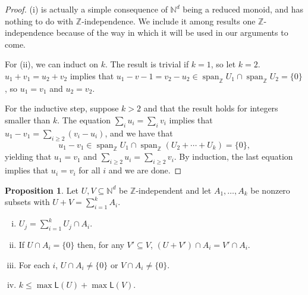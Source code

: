 \documentclass{report}
\newcommand{\NN}{\mathbb{N}}
\newcommand{\ZZ}{\mathbb{Z}}
\renewcommand{\:}{\text{:}}
\theoremstyle{definition}
\newtheorem{prop}[defn]{Proposition}
\begin{document}
\begin{proof}
(i) is actually a simple consequence of $\NN^d$ being a reduced monoid, and has nothing to do with $\ZZ$-independence.  
We include it among results one $\ZZ$-independence because of the way in which it will be used in our arguments to come.

For (ii), we can induct on $k$.
The result is trivial if $k = 1$, so let $k=2$.
$u_1 + v_1 = u_2 + v_2$ implies that $u_1 - v-1 = v_2 - u_2 \in \operatorname{span}_\ZZ U_1 \cap \operatorname{span}_\ZZ U_2 = \{0\}$, so $u_1 = v_1$ and $u_2 = v_2$.

For the inductive step, suppose $k>2$ and that the result holds for integers smaller than $k$.
The equation $\sum_i u_i = \sum_i v_i$ implies that $u_1 - v_1 = \sum_{i\ge 2} (v_i - u_i)$, and we have that 
\[u_1 - v_1 \in \operatorname{span}_\ZZ U_1 \cap \operatorname{span}_\ZZ(U_2+\cdots+ U_k) = \{0\},\]
yielding that $u_1 = v_1$ and $\sum_{i\ge 2} u_i = \sum_{i\ge 2} v_i$.
By induction, the last equation implies that $u_i = v_i$ for all $i$ and we are done.
\end{proof}

\begin{prop} \label{prop:indep-decomp}
Let $U,V \subseteq \NN^d$ be $\ZZ$-independent and let $A_1,\dots, A_k$ be nonzero subsets with $U+V = \sum_{i=1}^k A_i$.
\begin{enumerate}[(i)]
	\item $U_j = \sum_{i=1}^k U_j\cap A_i$.
	\item If $U \cap A_i = \{0\}$ then, for any $V'\subseteq V$, $(U+V')\cap A_i = V'\cap A_i$.
	\item For each $i$, $U\cap A_i \neq \{0\}$ or $V \cap A_i \neq \{0\}$.
	\item $k \le \max \mathsf{L}(U) + \max \mathsf{L}(V)$.
\end{enumerate}
\end{prop}
\end{document}
